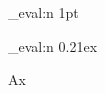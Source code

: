 \documentclass[naustrian]{scrartcl}
\begin{document}
\ExplSyntaxOn
\dim_eval:n { 1pt } \par
\dim_eval:n { 0.21ex }
\ExplSyntaxOff


A\testKnobellauchpresse[10] x

\DING{\testKnobellauchpresse}
\end{document}
